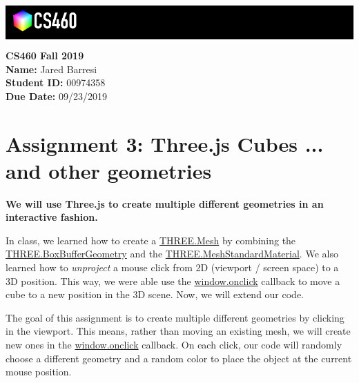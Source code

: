 \documentclass[10pt,oneside,onecolumn,letterpaper]{article}
\begin{document}
\noindent\colorbox{black}{
\begin{minipage}[c]{.99\linewidth}
  \vspace{.4cm}
  \Large{}
  \begin{flushright}
    \vspace{-1.2cm}
    \includegraphics[width=3cm]{gfx/cs460.png}
  \end{flushright}
\end{minipage}
}


\vspace{.5cm} %

\noindent\textbf{CS460 Fall 2019} \\
\textbf{Name:} Jared Barresi \\
\textbf{Student ID:} 00974358 \\
\textbf{Due Date:} 09/23/2019
\section*{Assignment 3: Three.js Cubes ... and other geometries}

\textbf{We will use Three.js to create multiple different geometries in an interactive fashion.}

\vspace{.5cm} %

In class, we learned how to create a \url{THREE.Mesh} by combining the \url{THREE.BoxBufferGeometry} and the \url{THREE.MeshStandardMaterial}. We also learned how to \emph{unproject} a mouse click from 2D (viewport / screen space) to a 3D position. This way, we were able use the \url{window.onclick} callback to move a cube to a new position in the 3D scene. Now, we will extend our code.

\vspace{.5cm}

The goal of this assignment is to create multiple different geometries by clicking in the viewport. This means, rather than moving an existing mesh, we will create new ones in the \url{window.onclick} callback. On each click, our code will randomly choose a different geometry and a random color to place the object at the current mouse position.
\end{document}
